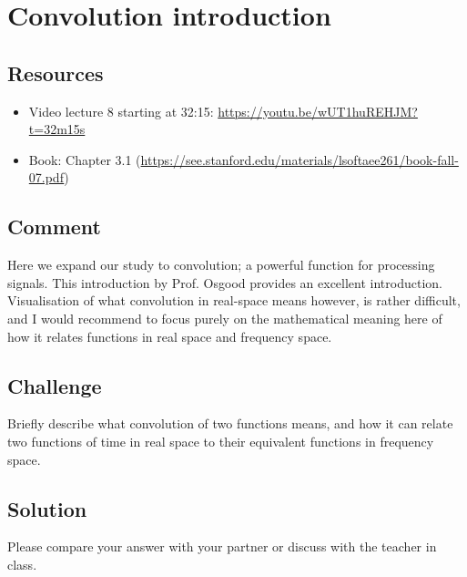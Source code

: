 \newpage
\section{Convolution introduction}

\subsection*{Resources}
\begin{itemize}
    \item Video lecture 8 starting at 32:15: \url{https://youtu.be/wUT1huREHJM?t=32m15s}
    \item Book: Chapter 3.1 (\url{https://see.stanford.edu/materials/lsoftaee261/book-fall-07.pdf})
\end{itemize}

\subsection*{Comment}
Here we expand our study to convolution; a powerful function for processing signals.
This introduction by Prof. Osgood provides an excellent introduction.
Visualisation of what convolution in real-space means however, is rather difficult, and I would recommend to focus purely on the mathematical meaning here of how it relates functions in real space and frequency space.

\subsection*{Challenge}
Briefly describe what convolution of two functions means, and how it can relate two functions of time in real space to their equivalent functions in frequency space.


\subsection*{Solution}
Please compare your answer with your partner or discuss with the teacher in class.




\newpage

